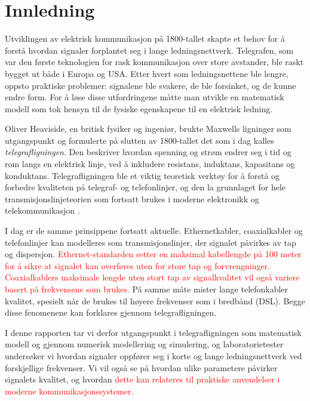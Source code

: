 \section{Innledning}

Utviklingen av elektrisk kommunikasjon på 1800-tallet skapte et behov for å forstå hvordan 
signaler forplantet seg i lange ledningsnettverk. Telegrafen, som var den første teknologien 
for rask kommunikasjon over store avstander, ble raskt bygget ut både i Europa og USA. Etter hvert 
som ledningsnettene ble lengre, oppsto praktiske problemer: signalene ble svakere, de ble 
forsinket, og de kunne endre form. For å løse disse utfordringene måtte man utvikle en matematisk 
modell som tok hensyn til de fysiske egenskapene til en elektrisk ledning.

Oliver Heaviside, en britisk fysiker og ingeniør, brukte Maxwells ligninger som utgangspunkt og 
formulerte på slutten av 1800-tallet det som i dag kalles \textit{telegrafligningen}. Den beskriver 
hvordan spenning og strøm endrer seg i tid og rom langs en elektrisk linje, ved å inkludere 
resistans, induktans, kapasitans og konduktans. Telegrafligningen ble et viktig teoretisk verktøy 
for å forstå og forbedre kvaliteten på telegraf- og telefonlinjer, og den la grunnlaget for hele 
transmisjonslinjeteorien som fortsatt brukes i moderne elektronikk og telekommunikasjon \cite{geeksforgeeks_telegrapher}.

I dag er de samme prinsippene fortsatt aktuelle. Ethernetkabler, coaxialkabler og telefonlinjer kan modelleres 
som transmisjonslinjer, der signalet påvirkes av tap og dispersjon. \textcolor{red}{Ethernet-standarden setter en 
maksimal kabellengde på 100 meter for å sikre at signalet kan overføres uten for store tap og 
forvrengninger. Coaxialkablers maksimale lengde uten stort tap av signalkvalitet vil også variere basert på frekvensene som brukes.} På samme måte mister lange telefonkabler kvalitet, spesielt når de brukes til høyere 
frekvenser som i bredbånd (DSL). Begge disse fenomenene kan forklares gjennom telegrafligningen.

I denne rapporten tar vi derfor utgangspunkt i telegrafligningen som matematisk modell og gjennom numerisk
modellering og simulering, og laboratorietester undersøker vi hvordan signaler oppfører seg i korte og 
lange ledningsnettverk ved forskjellige frekvenser. Vi vil også se på hvordan ulike parametere påvirker 
signalets kvalitet, og hvordan \textcolor{red}{dette kan relateres til praktiske anvendelser i moderne kommunikasjonssystemer.}